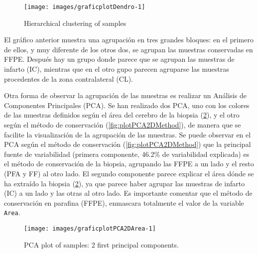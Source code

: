 \documentclass[a4paper]{article}\usepackage[]{graphicx}\usepackage[]{color}
\makeatletter
\def\maxwidth{ %
  \ifdim\Gin@nat@width>\linewidth
    \linewidth
  \else
    \Gin@nat@width
  \fi
}
\newenvironment{knitrout}{}{} %
\makeatother
\begin{document}
\begin{knitrout}
\color{fgcolor}\begin{figure}
\texttt{[image: images/graficplotDendro-1]} \caption[Hierarchical clustering of samples]{Hierarchical clustering of samples}\label{fig:plotDendro}
\end{figure}


\end{knitrout}





El gráfico anterior muestra una agrupación en tres grandes bloques: en el primero de ellos, y muy diferente de los otros dos, se agrupan las muestras conservadas en FFPE. Después hay un grupo donde parece que se agrupan las muestras de infarto (IC), mientras que en el otro gupo parecen agruparse las muestras procedentes de la zona contralateral (CL).

Otra forma de observar la agrupación de las muestras es realizar un Análisis de Componentes Principales (PCA). Se han realizado dos PCA, uno con los colores de las muestras definidos según el área del cerebro de la biopsia (\ref{fig:plotPCA2DArea}), y el otro según el método de conservación (\ref{fig:plotPCA2DMethod}),  de manera que se facilite la visualización de la agrupación de las muestras. Se puede observar en el PCA según el método de conservación (\ref{fig:plotPCA2DMethod}) que la principal fuente de variabilidad (primera componente, 46.2\% de variabilidad explicada)  es el método de conservación de la biopsia, agrupando las FFPE a un lado y el resto (PFA y FF) al otro lado. El segundo componente parece explicar el área dónde se ha extraído la biopsia (\ref{fig:plotPCA2DArea}), ya que parece haber agrupar las muestras de infarto (IC) a un lado y las otras al otro lado. Es importante comentar que el método de conservación en parafina (FFPE), enmascara totalmente el valor de la variable \texttt{Area}.



\begin{knitrout}
\color{fgcolor}\begin{figure}
\texttt{[image: images/graficplotPCA2DArea-1]} \caption[PCA plot of samples]{PCA plot of samples: 2 first principal components.}\label{fig:plotPCA2DArea}
\end{figure}


\end{knitrout}
\end{document}
